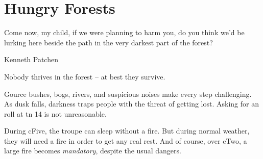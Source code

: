 \chapter{Hungry Forests}
\epigraph{Come now, my child, if we were planning to harm you, do you think we'd be lurking here beside the path in the very darkest part of the forest?}{Kenneth Patchen}

\noindent
Nobody thrives in the forest -- at best they survive.

Gource bushes, bogs, rivers, and suspicious noises make every step challenging.
As dusk falls, darkness traps people with the threat of getting lost.
Asking for an  roll at \gls{tn} 14 is not unreasonable.

During \gls{cFive}, the troupe can sleep without a fire.
But during normal weather, they will need a fire in order to get any real rest.
And of course, over \gls{cTwo}, a large fire becomes \emph{mandatory}, despite the usual dangers.%
